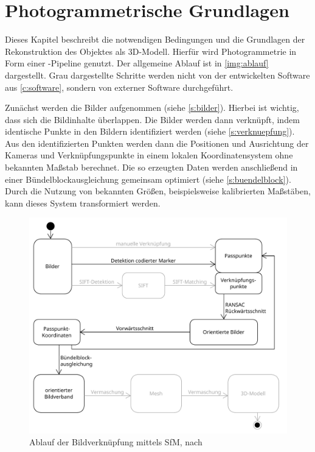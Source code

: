 \documentclass[./00PhotoBox.tex]{subfiles}
\begin{document}
\chapter{Photogrammetrische Grundlagen}
\label{c:photogrammetrie}
Dieses Kapitel beschreibt die notwendigen Bedingungen und die Grundlagen der Rekonstruktion des Objektes als 3D-Modell. Hierfür wird Photogrammetrie in Form einer -Pipeline genutzt. Der allgemeine Ablauf ist in \autoref{img:ablauf} dargestellt. Grau dargestellte Schritte werden nicht von der entwickelten Software aus \autoref{c:software}, sondern von externer Software durchgeführt.

Zunächst werden die Bilder aufgenommen (siehe \autoref{s:bilder}). Hierbei ist wichtig, dass sich die Bildinhalte überlappen. Die Bilder werden dann verknüpft, indem identische Punkte in den Bildern identifiziert werden  (siehe \autoref{s:verknuepfung}).
Aus den identifizierten Punkten werden dann die Positionen und Ausrichtung der Kameras und Verknüpfungspunkte in einem lokalen Koordinatensystem ohne bekannten Maßstab berechnet. Die so erzeugten Daten werden anschließend in einer Bündelblockausgleichung gemeinsam optimiert (siehe \autoref{s:buendelblock}). Durch die Nutzung von bekannten Größen, beispielsweise kalibrierten Maßstäben, kann dieses System transformiert werden.

\begin{figure}
    \centering
    \includegraphics[width=1\textwidth]{./img/uml/uml_ablauf.pdf}
    \caption{Ablauf der Bildverknüpfung mittels \acrfull{SfM}, nach \citealt[S. 492]{luhmann}}
    \label{img:ablauf}
\end{figure}
\end{document}
